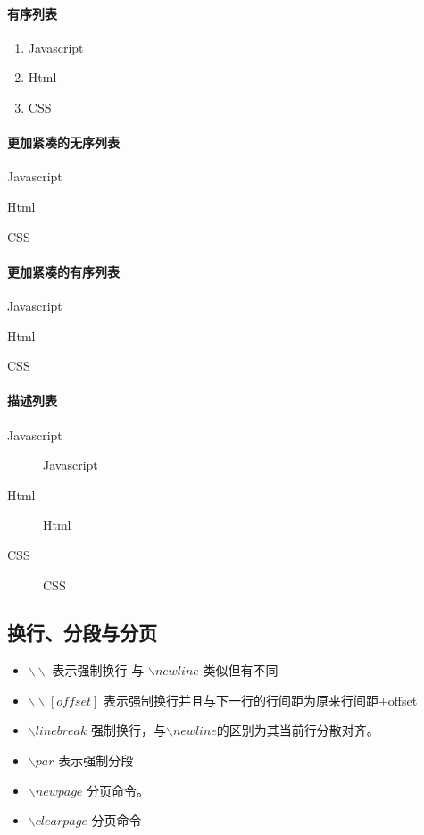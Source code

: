 \paragraph{有序列表}
\begin{enumerate}
  \item Javascript
  \item Html
  \item CSS
\end{enumerate}

\paragraph{更加紧凑的无序列表}
\begin{compactitem}
    \item Javascript
    \item Html
    \item CSS
\end{compactitem}

\paragraph{更加紧凑的有序列表}
\begin{compactenum}
    \item Javascript
    \item Html
    \item CSS
\end{compactenum}

\paragraph{描述列表}
\begin{description}
  \item[Javascript] Javascript
  \item[Html] Html
  \item[CSS] CSS
\end{description}


\subsection{换行、分段与分页}
\begin{itemize}
    \item $\backslash \backslash$ 表示强制换行 与 $\backslash newline$ 类似但有不同
    \item $\backslash \backslash[offset]$ 表示强制换行并且与下一行的行间距为原来行间距+offset
    \item $\backslash linebreak$ 强制换行，与$\backslash newline$的区别为其当前行分散对齐。
    \item $\backslash par$ 表示强制分段
    \item $\backslash newpage$ 分页命令。
    \item $\backslash clearpage$ 分页命令
\end{itemize}

